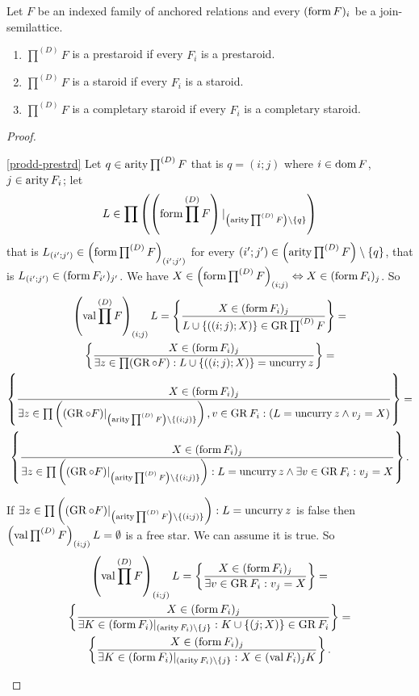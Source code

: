 \begin{prop}
Let $F$ be an indexed family of anchored relations and every $(\operatorname{form} F)_{i}$
be a join-semilattice.
\begin{enumerate}
\item \label{prodd-prestrd}$\prod^{(D)}F$ is a prestaroid if every $F_{i}$
is a prestaroid.
\item \label{prodd-strd}$\prod^{(D)}F$ is a staroid if every $F_{i}$
is a staroid.
\item \label{prodd-cmpl}$\prod^{(D)}F$ is a completary staroid if every
$F_{i}$ is a completary staroid.
\end{enumerate}
\end{prop}
\begin{proof}
~
\begin{widedisorder}
\item [{\ref{prodd-prestrd}}] Let $q\in\operatorname{arity}\prod^{(D)}F$ that is $q=(i;j)$
where $i\in\operatorname{dom} F$, $j\in\operatorname{arity} F_{i}$; let 
\[
L\in\prod\left(\left(\operatorname{form}\prod^{(D)}F\right)|_{\left(\operatorname{arity}\prod^{(D)}F\right)\setminus\{q\}}\right)
\]
that is $L_{(i';j')}\in\left(\operatorname{form}\prod^{(D)}F\right)_{(i';j')}$
for every $(i';j')\in\left(\operatorname{arity}\prod^{(D)}F\right)\setminus\{q\}$,
that is $L_{(i';j')}\in(\operatorname{form} F_{i'})_{j'}$. We have $X\in\left(\operatorname{form}\prod^{(D)}F\right)_{(i;j)}\Leftrightarrow X\in(\operatorname{form} F_{i})_{j}$.
So
\begin{gather*}
\left(\operatorname{val}\prod^{(D)}F\right)_{(i;j)}L=\left\{ \frac{X\in(\operatorname{form} F_{i})_{j}}{L\cup\{((i;j);X)\}\in\operatorname{GR}\prod^{(D)}F}\right\}=\\
\left\{ \frac{X\in(\operatorname{form} F_{i})_{j}}{\exists z\in\prod(\operatorname{GR}\circ F):L\cup\{((i;j);X)\}=\operatorname{uncurry} z}\right\}=\\
\left\{ \frac{X\in(\operatorname{form} F_{i})_{j}}{\exists z\in\prod\left((\operatorname{GR}\circ F)|_{\left(\operatorname{arity}\prod^{(D)}F\right)\setminus\{(i;j)\}}\right),v\in\operatorname{GR} F_{i}:(L=\operatorname{uncurry} z\land v_{j}=X)}\right\}=\\
\left\{ \frac{X\in(\operatorname{form} F_{i})_{j}}{\exists z\in\prod\left((\operatorname{GR}\circ F)|_{\left(\operatorname{arity}\prod^{(D)}F\right)\setminus\{(i;j)\}}\right):L=\operatorname{uncurry} z\land\exists v\in\operatorname{GR} F_{i}:v_{j}=X}\right\}.
\end{gather*}



If $\exists z\in\prod\left((\operatorname{GR}\circ F)|_{\left(\operatorname{arity}\prod^{(D)}F\right)\setminus\{(i;j)\}}\right):L=\operatorname{uncurry} z$
is false then $\left(\operatorname{val}\prod^{(D)}F\right)_{(i;j)}L=\emptyset$
is a free star. We can assume it is true. So
\begin{gather*}
\left(\operatorname{val}\prod^{(D)}F\right)_{(i;j)}L=\left\{ \frac{X\in(\operatorname{form} F_{i})_{j}}{\exists v\in\operatorname{GR} F_{i}:v_{j}=X}\right\}=\\
\left\{ \frac{X\in(\operatorname{form} F_{i})_{j}}{\exists K\in(\operatorname{form} F_{i})|_{(\operatorname{arity} F_{i})\setminus\{j\}}:K\cup\{(j;X)\}\in\operatorname{GR} F_{i}}\right\}=\\
\left\{ \frac{X\in(\operatorname{form} F_{i})_{j}}{\exists K\in(\operatorname{form} F_{i})|_{(\operatorname{arity} F_{i})\setminus\{j\}}:X\in(\operatorname{val} F_{i})_{j}K}\right\}.
\end{gather*}




\end{widedisorder}
\end{proof}
